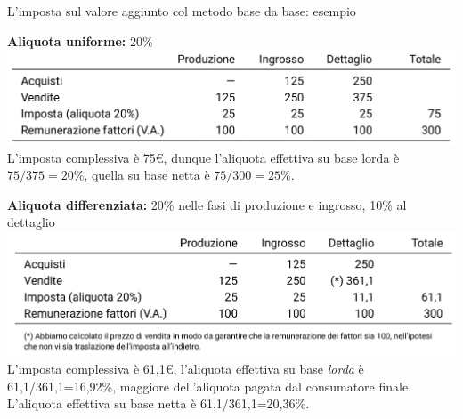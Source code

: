 \documentclass[aspectratio=149,11pt,italian]{beamer}
\begin{document}
\begin{frame}{L'imposta sul valore aggiunto col metodo base da base: esempio}
  \vspace*{-3.5mm}\footnotesize
  \begin{block}{}
    \textbf{Aliquota uniforme:} 20\%\\
    \includegraphics[width=.8\textwidth]{./figure/esempio-base-da-base-aliquota-uniforme.png}\\
    L'imposta complessiva è 75€, dunque l'aliquota effettiva su base lorda
    è $75/375=20\%$, quella su base netta è $75/300=25\%$.
  \end{block}
  \begin{block}{}
    \textbf{Aliquota differenziata:} 20\% nelle fasi di produzione e ingrosso, 10\% al
      dettaglio\\
      \includegraphics[width=.8\textwidth]{./figure/esempio-base-da-base-aliquota-differenziata.png}\\
    L'imposta complessiva è 61,1€, l'aliquota effettiva su base \emph{lorda} è
    61,1/361,1=16,92\%, maggiore dell'aliquota pagata dal consumatore
    finale. L'aliquota effettiva su base netta è 61,1/361,1=20,36\%.
  \end{block}
\end{frame}
\end{document}
